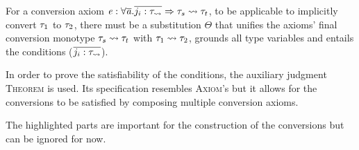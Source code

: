 For a conversion axiom $\mathit{e} : \forall \overline{\mathit{a}}.\overline{j_i:\mathit{\tau_{\rightsquigarrow}}} \Rightarrow \mathit{\tau}_s \rightsquigarrow \mathit{\tau}_t$, to be applicable to implicitly convert $\mathit{\tau}_1$ to $\mathit{\tau}_2$, there must be a substitution $\Theta$ that unifies the axioms' final conversion monotype $\mathit{\tau}_s \rightsquigarrow \mathit{\tau}_t$ with $\mathit{\tau}_1 \rightsquigarrow \mathit{\tau}_2$, grounds all type variables and entails the conditions ($\overline{j_i:\mathit{\tau_{\rightsquigarrow}}}$).

In order to prove the satisfiability of the conditions, the auxiliary judgment \textsc{Theorem} is used. Its specification resembles \textsc{Axiom}'s but it allows for the conversions to be satisfied by composing multiple conversion axioms.

The highlighted parts are important for the construction of the conversions but can be ignored for now.
